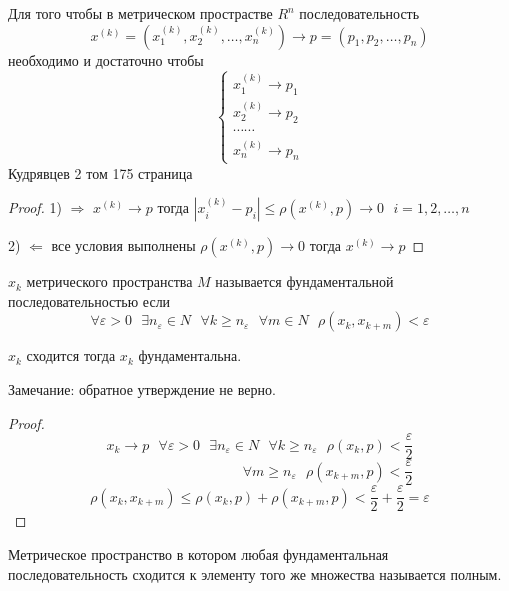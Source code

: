 \begin{block}
  Для того чтобы в метрическом прострастве $R^n$ последовательность
  $$
  x^{(k)} = (x_1^{(k)}, x_2^{(k)}, \ldots, x_n^{(k)}) \to
  p = (p_1, p_2, \ldots, p_n)
  $$
  необходимо и достаточно чтобы
  $$
  \left\{
  \begin{array}{c}
    x_1^{(k)} \to p_1 \\
    x_2^{(k)} \to p_2 \\
    \cdots \cdots \\
    x_n^{(k)} \to p_n
  \end{array}
  \right.
  $$
  Кудрявцев 2 том 175 страница
\end{block}

\begin{proof}
  1) $\Rightarrow$ $x^{(k)} \to p$ тогда $|x_i^{(k)} - p_i| \le
  \rho(x^{(k)}, p) \to 0 ~~~ i = 1, 2, \ldots, n$

  2) $\Leftarrow$ все условия выполнены $\rho(x^{(k)}, p) \to 0$ тогда
  $x^{(k)} \to p$
\end{proof}

\begin{define}
  $x_k$ метрического пространства $M$ называется фундаментальной
  последовательностью если
  $$
  \forall \varepsilon > 0 ~~~ \exists n_{\varepsilon} \in N ~~~
  \forall k \ge n_{\varepsilon} ~~~ \forall m \in N ~~~ \rho(x_k, x_{k+m}) <
  \varepsilon
  $$
\end{define}

\begin{theorem}
  $x_k$ сходится тогда $x_k$ фундаментальна.

  Замечание: обратное утверждение не верно.
\end{theorem}

\begin{proof}
  $$
  x_k \to p ~~~ \forall \varepsilon > 0 ~~~ \exists n_{\varepsilon} \in N ~~~
  \forall k \ge n_{\varepsilon} ~~~ \rho(x_k, p) < \frac{\varepsilon}{2}
  $$
  $$
  ~~~~~~~~~~~~~~~~~~~~~~~~~~~~~~~~~~~~~~~~~~~~
  \forall m \ge n_{\varepsilon} ~~~ \rho(x_{k + m}, p) < \frac{\varepsilon}{2}
  $$
  $$
  \rho(x_k, x_{k+m}) \le \rho(x_k, p) + \rho(x_{k+m}, p)
  < \frac{\varepsilon}{2} + \frac{\varepsilon}{2} = \varepsilon
  $$
\end{proof}

\begin{define}
  Метрическое пространство в котором любая фундаментальная последовательность
  сходится к элементу того же множества называется полным.
\end{define}

